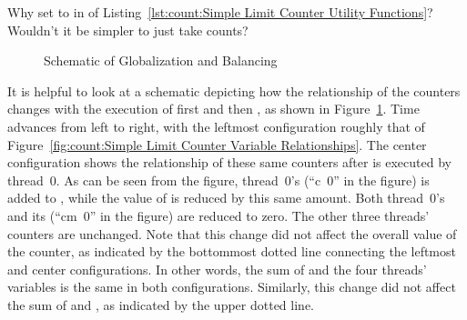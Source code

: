 \QuickQuiz{}
	\begin{lineref}
	Why set  to  in  of
	Listing~\ref{lst:count:Simple Limit Counter Utility Functions}?
	Wouldn't it be simpler to just take  counts?
	\end{lineref}
 \QuickQuizEnd

\begin{figure}[tb]
\centering
{}
\caption{Schematic of Globalization and Balancing}
\label{fig:count:Schematic of Globalization and Balancing}
\end{figure}

It is helpful to look at a schematic depicting how the relationship
of the counters changes with the execution of first
 and then , as shown in
Figure~\ref{fig:count:Schematic of Globalization and Balancing}.
Time advances from left to right, with the leftmost configuration
roughly that of
Figure~\ref{fig:count:Simple Limit Counter Variable Relationships}.
The center configuration shows the relationship of these same counters
after  is executed by thread~0.
As can be seen from the figure, thread~0's  (``c~0'' in
the figure) is added to , while the value of
 is reduced by this same amount.
Both thread~0's  and its 
(``cm~0'' in the figure) are reduced to zero.
The other three threads' counters are unchanged.
Note that this change did not affect the overall value of the counter,
as indicated by the bottommost dotted line connecting the leftmost
and center configurations.
In other words, the sum of  and the four threads'
 variables is the same in both configurations.
Similarly, this change did not affect the sum of  and
, as indicated by the upper dotted line.

